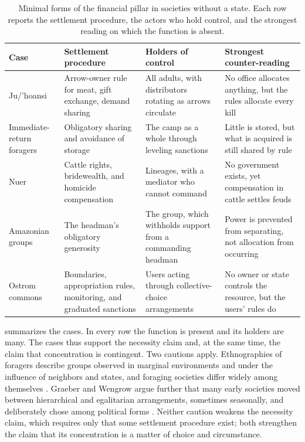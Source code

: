 \documentclass[11pt,letterpaper]{article}
\theoremstyle{definition}
\theoremstyle{remark}
\begin{document}
\begin{table}[t]
\centering
\small
\caption{Minimal forms of the financial pillar in societies without a state. Each row reports the settlement procedure, the actors who hold control, and the strongest reading on which the function is absent.}
\label{tab:minimal}
\begin{tabularx}{\linewidth}{@{}L{2.3cm}YYY@{}}
\toprule
Case & Settlement procedure & Holders of control & Strongest counter-reading \\
\midrule
Ju/'hoansi & Arrow-owner rule for meat, gift exchange, demand sharing & All adults, with distributors rotating as arrows circulate & No office allocates anything, but the rules allocate every kill \\
Immediate-return foragers & Obligatory sharing and avoidance of storage & The camp as a whole through leveling sanctions & Little is stored, but what is acquired is still shared by rule \\
Nuer & Cattle rights, bridewealth, and homicide compensation & Lineages, with a mediator who cannot command & No government exists, yet compensation in cattle settles feuds \\
Amazonian groups & The headman's obligatory generosity & The group, which withholds support from a commanding headman & Power is prevented from separating, not allocation from occurring \\
Ostrom commons & Boundaries, appropriation rules, monitoring, and graduated sanctions & Users acting through collective-choice arrangements & No owner or state controls the resource, but the users' rules do \\
\bottomrule
\end{tabularx}
\end{table}

 summarizes the cases. In every row the function is present and its holders are many. The cases thus support the necessity claim and, at the same time, the claim that concentration is contingent. Two cautions apply. Ethnographies of foragers describe groups observed in marginal environments and under the influence of neighbors and states, and foraging societies differ widely among themselves \citep{kelly1995}. Graeber and Wengrow argue further that many early societies moved between hierarchical and egalitarian arrangements, sometimes seasonally, and deliberately chose among political forms \citep{graeber2021}. Neither caution weakens the necessity claim, which requires only that some settlement procedure exist; both strengthen the claim that its concentration is a matter of choice and circumstance.
\end{document}
